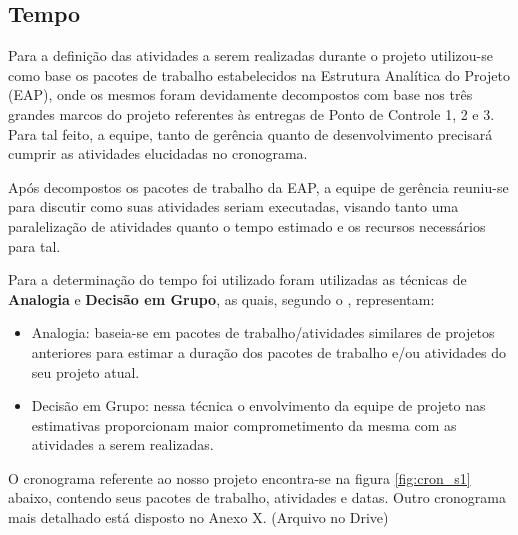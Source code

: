     \subsection{Tempo}

Para a definição das atividades a serem realizadas durante o
projeto utilizou-se como base os pacotes de trabalho estabelecidos
na Estrutura Analítica do Projeto (EAP), onde os mesmos foram devidamente
decompostos com base nos três grandes marcos do projeto referentes
às entregas de Ponto de Controle 1, 2 e 3. Para tal feito, a equipe,
tanto de gerência quanto de desenvolvimento precisará cumprir
as atividades elucidadas no cronograma.

Após decompostos os pacotes de trabalho da EAP, a equipe
de gerência reuniu-se para discutir como suas atividades seriam
executadas, visando tanto uma paralelização de atividades quanto
o tempo estimado e os recursos necessários para tal.

Para a determinação do tempo foi utilizado foram utilizadas as
técnicas de \textbf{Analogia} e \textbf{Decisão em Grupo},
as quais, segundo o \cite{PMI2012}, representam:
\begin{itemize}
\item Analogia: baseia-se em pacotes de trabalho/atividades similares
de projetos anteriores para estimar a duração dos pacotes de trabalho
e/ou atividades do seu projeto atual.
\item Decisão em Grupo: nessa técnica o envolvimento da equipe de projeto
nas estimativas proporcionam maior comprometimento da mesma com as
atividades a serem realizadas.
\end{itemize}

O cronograma referente ao nosso projeto encontra-se na figura \ref{fig:cron_s1}
abaixo, contendo seus pacotes de trabalho, atividades e datas. Outro
cronograma mais detalhado está disposto no Anexo X. (Arquivo no Drive)

